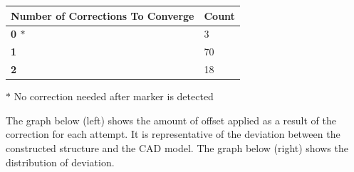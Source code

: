 \documentclass[11pt]{book}
\begin{document}
\begin{table}[H]
\begin{adjustbox}{max width=\textwidth}
\begin{tabular}{p{8.61cm}p{7.27cm}}
\hline
\multicolumn{1}{|p{8.61cm}}{{\footnotesize \textbf{Number of Corrections To Converge}}} & 
\multicolumn{1}{|p{7.27cm}|}{{\footnotesize \textbf{Count}}} \\ 
\hline
\multicolumn{1}{|p{8.61cm}}{{\footnotesize \textbf{0 $\ast$}}} & 
\multicolumn{1}{|p{7.27cm}|}{{\footnotesize 3}} \\ 
\hline
\multicolumn{1}{|p{8.61cm}}{{\footnotesize \textbf{1}}} & 
\multicolumn{1}{|p{7.27cm}|}{{\footnotesize 70}} \\ 
\hline
\multicolumn{1}{|p{8.61cm}}{{\footnotesize \textbf{2}}} & 
\multicolumn{1}{|p{7.27cm}|}{{\footnotesize 18}} \\ 
\hline
\end{tabular}
\end{adjustbox}
\end{table}
{\footnotesize $\ast$ No correction needed after marker is detected}

The graph below (left) shows the amount of offset applied as a result of the correction for each attempt. It is representative of the deviation between the constructed structure and the CAD model. The graph below (right) shows the distribution of deviation.
\end{document}
